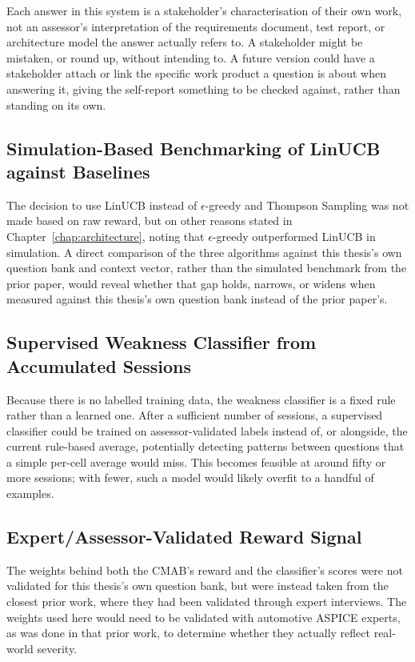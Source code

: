 \documentclass[a4paper, 12pt, oneside, openany, BCOR1cm,toc=chapterentrywithdots]{scrbook}
\begin{document}
Each answer in this system is a stakeholder's characterisation of their own work, not an
assessor's interpretation of the requirements document, test report, or architecture model the
answer actually refers to. A stakeholder might be mistaken, or round up, without intending to. A
future version could have a stakeholder attach or link the specific work product a question is
about when answering it, giving the self-report something to be checked against, rather than
standing on its own.

\subsection{Simulation-Based Benchmarking of LinUCB against Baselines}

The decision to use LinUCB instead of $\epsilon$-greedy and Thompson Sampling was not made based
on raw reward, but on other reasons stated in Chapter~\ref{chap:architecture}, noting that
$\epsilon$-greedy outperformed LinUCB in simulation. A direct comparison of the three algorithms
against this thesis's own question bank and context vector, rather than the simulated benchmark
from the prior paper, would reveal whether that gap holds, narrows, or widens when measured
against this thesis's own question bank instead of the prior paper's.

\subsection{Supervised Weakness Classifier from Accumulated Sessions}

Because there is no labelled training data, the weakness classifier is a fixed rule rather than
a learned one. After a sufficient number of sessions, a supervised classifier could be trained on
assessor-validated labels instead of, or alongside, the current rule-based average, potentially
detecting patterns between questions that a simple per-cell average would miss. This becomes
feasible at around fifty or more sessions; with fewer, such a model would likely overfit to a
handful of examples.

\subsection{Expert/Assessor-Validated Reward Signal}

The weights behind both the CMAB's reward and the classifier's scores were not validated for
this thesis's own question bank, but were instead taken from the closest prior work, where they
had been validated through expert interviews. The weights used here would need to be validated
with automotive ASPICE experts, as was done in that prior work, to determine whether they
actually reflect real-world severity.
\end{document}
